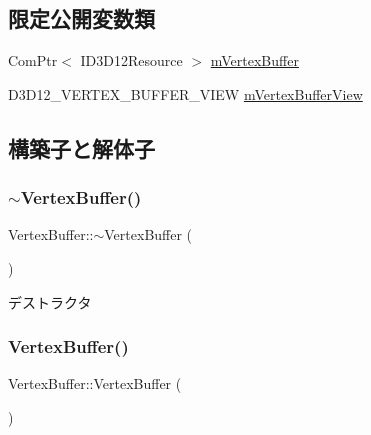 \subsection*{限定公開変数類}
\begin{DoxyCompactItemize}
\item 
Com\+Ptr$<$ I\+D3\+D12\+Resource $>$ \mbox{\hyperlink{class_vertex_buffer_aadda88c933f0e44a84402af9cc6e0dda}{m\+Vertex\+Buffer}}
\item 
D3\+D12\+\_\+\+V\+E\+R\+T\+E\+X\+\_\+\+B\+U\+F\+F\+E\+R\+\_\+\+V\+I\+EW \mbox{\hyperlink{class_vertex_buffer_a42f71aacaf7c1da89bcb729e3f6cf091}{m\+Vertex\+Buffer\+View}}
\end{DoxyCompactItemize}


\subsection{構築子と解体子}
\mbox{\label{class_vertex_buffer_a5216726fdd43b2ae8e1439e347717fdd}} 
\subsubsection{\texorpdfstring{$\sim$\+Vertex\+Buffer()}{~VertexBuffer()}}
{\footnotesize\ttfamily Vertex\+Buffer\+::$\sim$\+Vertex\+Buffer (\begin{DoxyParamCaption}{ }\end{DoxyParamCaption})}



デストラクタ 

\mbox{\label{class_vertex_buffer_adb25d82a47ad82d5b69a75ac111401b8}} 
\subsubsection{\texorpdfstring{Vertex\+Buffer()}{VertexBuffer()}\hspace{0.1cm}{\footnotesize\ttfamily [1/2]}}
{\footnotesize\ttfamily Vertex\+Buffer\+::\+Vertex\+Buffer (\begin{DoxyParamCaption}{ }\end{DoxyParamCaption})\hspace{0.3cm}{\ttfamily [protected]}}




